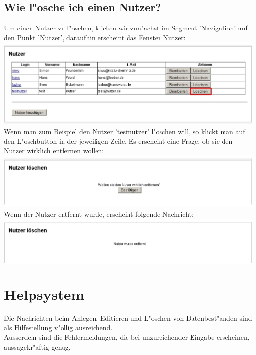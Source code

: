 \subsection{Wie l"osche ich einen Nutzer?}  
Um einen Nutzer zu l"oschen, klicken wir zun"achst im Segment 'Navigation' auf den Punkt 'Nutzer', daraufhin erscheint das Fenster 
Nutzer:\\
\includegraphics[scale=0.5]{nutzerloe}\\
Wenn man zum Beispiel den Nutzer 'testnutzer' l"oschen will, so klickt man auf den L"oschbutton in der jeweiligen Zeile.
Es erscheint eine Frage, ob sie den Nutzer wirklich entfernen wollen:\\
\includegraphics[scale=0.5]{nutzerloe2}\\
Wenn der Nutzer entfernt wurde, erscheint folgende Nachricht:\\
\includegraphics[scale=0.5]{nutzerloe3}

\section{Helpsystem}
Die Nachrichten beim Anlegen, Editieren und L"oschen von Datenbest"anden sind als Hilfestellung v"ollig ausreichend.\\
Ausserdem sind die Fehlermeldungen, die bei unzureichender Eingabe erscheinen, aussagekr"aftig genug.
